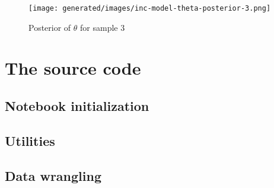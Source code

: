 \documentclass[
  digital, %
  oneside, %
  lof,     %
  lot,     %
]{fithesis4}
\begin{document}
\begin{figure}[H]
  \begin{center}
    \texttt{[image: generated/images/inc-model-theta-posterior-3.png]}
  \end{center}
  \caption{Posterior of $\theta$ for sample 3}
  \label{fig:theta-posterior-3}
\end{figure}

\newpage
\section{The source code}

\subsection{Notebook initialization}




\subsection{Utilities}








% 


\subsection{Data wrangling}












\end{document}
